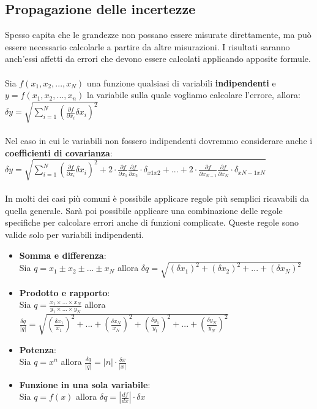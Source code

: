 \documentclass{article}
\begin{document}
\subsection{Propagazione delle incertezze}
Spesso capita che le grandezze non possano essere misurate direttamente, ma può essere necessario calcolarle a partire da altre misurazioni. I risultati saranno anch'essi affetti da errori che devono essere calcolati applicando apposite formule.\\\\
Sia $f(x_1, x_2, ..., x_N)$ una funzione qualsiasi di variabili \textbf{indipendenti} e $y=f(x_1, x_2, ..., x_n)$ la variabile sulla quale vogliamo calcolare l'errore, allora: 
$\delta y = \sqrt{\sum_{i=1} ^N \left(\frac{\partial f}{\partial x_i} \delta x_i \right)^2}$\\\\
Nel caso in cui le variabili non fossero indipendenti dovremmo considerare anche i \textbf{coefficienti di covarianza}:\\ $\delta y = \sqrt{\sum_{i=1} ^N \left(\frac{\partial f}{\partial x_i} \delta x_i \right)^2 + 2 \cdot \frac{\partial f}{\partial x_1} \frac{\partial f}{\partial x_2} \cdot \delta_{x1 x2} + ... + 2 \cdot \frac{\partial f}{\partial x_{N-1}} \frac{\partial f}{\partial x_N} \cdot \delta_{xN-1 xN}}$\\\\
In molti dei casi più comuni è possibile applicare regole più semplici ricavabili da quella generale. Sarà poi possibile applicare una combinazione delle regole specifiche per calcolare errori anche di funzioni complicate. Queste regole sono valide solo per variabili indipendenti.
\begin{itemize}
    \item \textbf{Somma e differenza}:\\
    Sia $q=x_1 \pm x_2 \pm ... \pm x_N$ allora $\delta q = \sqrt{\left( \delta x_1 \right)^2 + \left( \delta x_2 \right)^2 + ... + \left( \delta x_N \right)^2}$

    \item \textbf{Prodotto e rapporto}:\\
    Sia $q = \frac{x_1 \times ... \times x_N}{y_1 \times ... \times y_N}$ allora $\frac{\delta q}{|q|} = 
    \sqrt{\left( \frac{\delta x_1}{x_1} \right)^2 + ... + \left( \frac{\delta x_N}{x_N} \right)^2 + \left( \frac{\delta y_1}{y_1} \right)^2 + ... + \left( \frac{\delta y_N}{y_N} \right)^2}$

    \item \textbf{Potenza}:\\
    Sia $q=x^n$ allora $\frac{\delta q}{|q|} =|n| \cdot \frac{\delta x}{|x|}$
    
    \item \textbf{Funzione in una sola variabile}:\\
    Sia $q=f(x)$ allora $\delta q = \left| \frac{df}{dx} \right| \cdot \delta x$
    
\end{itemize}
\end{document}
